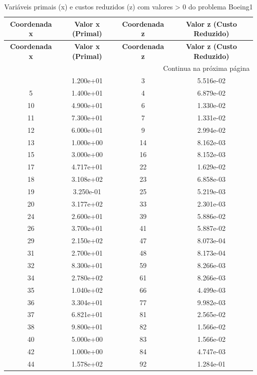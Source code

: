 \documentclass[12pt]{article}
\begin{document}
\begin{longtable}{@{}cccc@{}}
\caption{Variáveis primais (x) e custos reduzidos (z) com valores > 0 do problema Boeing1} \\
\toprule
\textbf{Coordenada x} & \textbf{Valor x (Primal)} & \textbf{Coordenada z} & \textbf{Valor z (Custo Reduzido)} \\
\midrule
\endfirsthead

\toprule
\textbf{Coordenada x} & \textbf{Valor x (Primal)} & \textbf{Coordenada z} & \textbf{Valor z (Custo Reduzido)} \\
\midrule
\endhead

\midrule \multicolumn{4}{r}{{Continua na próxima página}} \\ \midrule
\endfoot

\bottomrule
\endlastfoot
2 & 1.200e+01 & 3 & 5.516e-02 \\
5 & 1.400e+01 & 4 & 6.879e-02 \\
10 & 4.900e+01 & 6 & 1.330e-02 \\
11 & 7.300e+01 & 7 & 1.331e-02 \\
12 & 6.000e+01 & 9 & 2.994e-02 \\
13 & 1.000e+00 & 14 & 8.162e-03 \\
15 & 3.000e+00 & 16 & 8.152e-03 \\
17 & 4.717e+01 & 22 & 1.629e-02 \\
18 & 3.108e+02 & 23 & 6.858e-03 \\
19 & 3.250e-01 & 25 & 5.219e-03 \\
20 & 3.177e+02 & 33 & 2.301e-03 \\
24 & 2.600e+01 & 39 & 5.886e-02 \\
26 & 3.700e+01 & 41 & 5.887e-02 \\
29 & 2.150e+02 & 47 & 8.073e-04 \\
31 & 2.700e+01 & 48 & 8.173e-04 \\
32 & 8.300e+01 & 59 & 8.266e-03 \\
34 & 2.780e+02 & 61 & 8.266e-03 \\
35 & 1.040e+02 & 66 & 4.499e-03 \\
36 & 3.304e+01 & 77 & 9.982e-03 \\
37 & 6.821e+01 & 81 & 2.565e-02 \\
38 & 9.800e+01 & 82 & 1.566e-02 \\
40 & 5.000e+00 & 83 & 1.566e-02 \\
42 & 1.000e+00 & 84 & 4.747e-03 \\
44 & 1.578e+02 & 92 & 1.284e-01 \\

\end{longtable}
\end{document}
